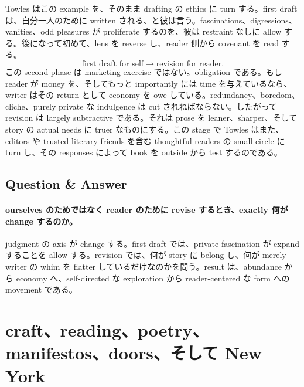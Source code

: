 Towles はこの example を、そのまま drafting の ethics に turn する。first draft は、自分一人のために written される、と彼は言う。fascinations、digressions、vanities、odd pleasures が proliferate するのを、彼は restraint なしに allow する。後になって初めて、lens を reverse し、reader 側から covenant を read する。
\begin{equation}
\text{first draft for self} \longrightarrow \text{revision for reader}.
\end{equation}
この second phase は marketing exercise ではない。obligation である。もし reader が money を、そしてもっと importantly には time を与えているなら、writer はその return として economy を owe している。redundancy、boredom、cliche、purely private な indulgence は cut されねばならない。したがって revision は largely subtractive である。それは prose を leaner、sharper、そして story の actual needs に truer なものにする。この stage で Towles はまた、editors や trusted literary friends を含む thoughtful readers の small circle に turn し、その responses によって book を outside から test するのである。

\subsection{Question \& Answer}

\paragraph{ourselves のためではなく reader のために revise するとき、exactly 何が change するのか。}

judgment の axis が change する。first draft では、private fascination が expand することを allow する。revision では、何が story に belong し、何が merely writer の whim を flatter しているだけなのかを問う。result は、abundance から economy へ、self-directed な exploration から reader-centered な form への movement である。

\section{craft、reading、poetry、manifestos、doors、そして New York}

